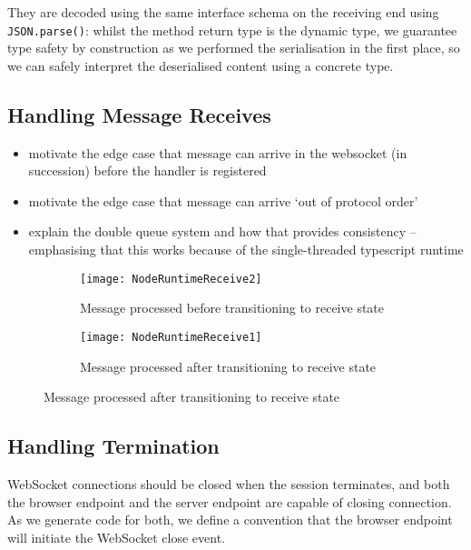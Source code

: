 They are decoded using the same interface schema on the receiving end
using \texttt{JSON.parse()}: whilst the method return type is the
dynamic  type, 
we guarantee type safety by construction
as we performed the serialisation in the first place, so
we can safely interpret the deserialised content 
using a concrete type.

\subsection{Handling Message Receives}
\begin{itemize}
\item motivate the edge case that message can arrive in the websocket (in succession) before the handler is registered
\item motivate the edge case that message can arrive `out of protocol order' 
\item explain the double queue system and how that provides consistency -- emphasising that this works because of the single-threaded typescript runtime
\end{itemize}

\begin{figure}[!ht]
\centering
\begin{subfigure}[b]{0.8\textwidth}
\centering
\texttt{[image: NodeRuntimeReceive2]}
\caption{Message processed before transitioning to receive state}
\label{subfig:nodereceivemsgfirst}
\end{subfigure}
\hfill
\begin{subfigure}[b]{0.8\textwidth}
\centering
\texttt{[image: NodeRuntimeReceive1]}
\caption{Message processed after transitioning to receive state}
\label{subfig:nodereceivehandlefirst}
\end{subfigure}
\label{fig:nodereceivecompare}
\end{figure}

\subsection{Handling Termination}
WebSocket connections should be closed when the session terminates,
and both the browser endpoint and the server endpoint are capable
of closing connection. As we generate code for both, we define
a convention that the browser endpoint will initiate the WebSocket
close event.